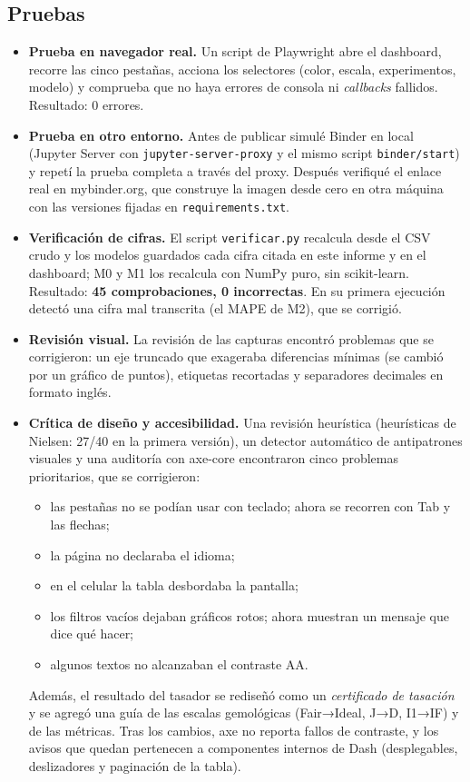 \documentclass[12pt,letterpaper]{article}
\begin{document}
\subsection{Pruebas}

\begin{itemize}[leftmargin=1.2cm,itemsep=0.25em]
\item \textbf{Prueba en navegador real.} Un script de Playwright abre el
dashboard, recorre las cinco pestañas, acciona los selectores (color, escala,
experimentos, modelo) y comprueba que no haya errores de consola ni
\emph{callbacks} fallidos. Resultado: 0 errores.
\item \textbf{Prueba en otro entorno.} Antes de publicar simulé Binder en local
(Jupyter Server con \texttt{jupyter-server-proxy} y el mismo script
\texttt{binder/start}) y repetí la prueba completa a través del proxy. Después
verifiqué el enlace real en mybinder.org, que construye la imagen desde cero en
otra máquina con las versiones fijadas en \texttt{requirements.txt}.
\item \textbf{Verificación de cifras.} El script \texttt{verificar.py} recalcula
desde el CSV crudo y los modelos guardados cada cifra citada en este informe y en
el dashboard; M0 y M1 los recalcula con NumPy puro, sin scikit-learn. Resultado:
\textbf{45 comprobaciones, 0 incorrectas}. En su primera ejecución detectó una
cifra mal transcrita (el MAPE de M2), que se corrigió.
\item \textbf{Revisión visual.} La revisión de las capturas encontró problemas que
se corrigieron: un eje truncado que exageraba diferencias mínimas (se cambió por
un gráfico de puntos), etiquetas recortadas y separadores decimales en formato
inglés.
\item \textbf{Crítica de diseño y accesibilidad.} Una revisión heurística
(heurísticas de Nielsen: 27/40 en la primera versión), un detector automático de
antipatrones visuales y una auditoría con axe-core encontraron cinco problemas
prioritarios, que se corrigieron:
\begin{itemize}[leftmargin=0.8cm,itemsep=0.1em]
\item las pestañas no se podían usar con teclado; ahora se recorren con Tab y las flechas;
\item la página no declaraba el idioma;
\item en el celular la tabla desbordaba la pantalla;
\item los filtros vacíos dejaban gráficos rotos; ahora muestran un mensaje que dice qué hacer;
\item algunos textos no alcanzaban el contraste AA.
\end{itemize}
Además, el resultado del tasador se rediseñó como un \emph{certificado de
tasación} y se agregó una guía de las escalas gemológicas (Fair→Ideal, J→D,
I1→IF) y de las métricas. Tras los cambios, axe no reporta fallos de contraste, y
los avisos que quedan pertenecen a componentes internos de Dash (desplegables,
deslizadores y paginación de la tabla).
\end{itemize}
\end{document}
